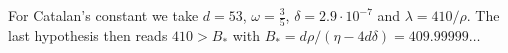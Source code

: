 \documentclass[11pt]{amsart}
\newcommand{\Bstar}{409.99999}
\theoremstyle{definition}
\theoremstyle{remark}
\numberwithin{equation}{section}
\begin{document}
For Catalan's constant we take $d=53$, $\omega=\frac35$, $\delta=2.9\cdot10^{-7}$ and $\lambda=410/\rho$.
The last hypothesis then reads $410>B_*$ with $B_*=d\rho/(\eta-4d\delta)=\Bstar\ldots$








\appendix




\end{document}

